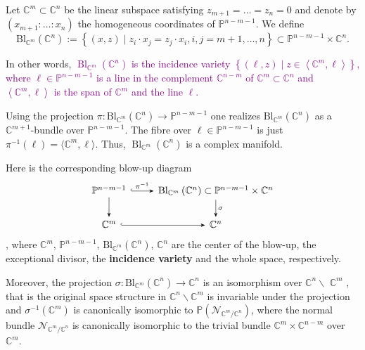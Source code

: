 \begin{exam}
    Let $\mathbb{C}^m \subset \mathbb{C}^n$ be the linear subspace satisfying $z_{m+1}=\ldots=z_n=0$ and denote by $\left(x_{m+1}: \ldots: x_n\right)$ the homogeneous coordinates of $\mathbb{P}^{n-m-1}$. We define
$$
\mathrm{Bl}_{\mathbb{C}^m}\left(\mathbb{C}^n\right):=\left\{(x, z) \mid z_i \cdot x_j=z_j \cdot x_i, i, j=m+1, \ldots, n\right\} \subset \mathbb{P}^{n-m-1} \times \mathbb{C}^n .
$$

In other words, \textcolor{purple}{$\operatorname{Bl}_{\mathbb{C}^m}\left(\mathbb{C}^n\right)$ is the incidence variety $\left\{(\ell, z) \mid z \in\left\langle\mathbb{C}^m, \ell\right\rangle\right\}$, where $\ell \in \mathbb{P}^{n-m-1}$ is a line in the complement $\mathbb{C}^{n-m}$ of $\mathbb{C}^m \subset \mathbb{C}^n$ and $\left\langle\mathbb{C}^m, \ell\right\rangle$ is the span of $\mathbb{C}^m$ and the line $\ell$.}

Using the projection $\pi: \mathrm{Bl}_{\mathbb{C}^m}\left(\mathbb{C}^n\right) \rightarrow \mathbb{P}^{n-m-1}$ one realizes $\mathrm{Bl}_{\mathbb{C}^m}\left(\mathbb{C}^n\right)$ as a $\mathbb{C}^{m+1}$-bundle over $\mathbb{P}^{n-m-1}$. The fibre over $\ell \in \mathbb{P}^{n-m-1}$ is just $\pi^{-1}(\ell)=\langle \mathbb{C}^m,\ell\rangle$. Thus, $\operatorname{Bl}_{\mathbb{C}^m}(\mathbb{C}^n)$ is a complex manifold.

Here is the corresponding blow-up diagram
\[
    \begin{tikzcd}
        \mathbb{P}^{n-m-1}\dar[-Stealth]\rar[-Stealth,hook,"\pi^{-1}"] & \mathrm{Bl}_{\mathbb{C}^m}\left(\mathbb{C}^n\right) \subset \mathbb{P}^{n-m-1}\times \mathbb{C}^n\dar[-Stealth,"\sigma"]\\ 
        \mathbb{C}^m \rar[-Stealth,hook] & \mathbb{C}^n
    \end{tikzcd}
\]  
, where $\mathbb{C}^m$, $\mathbb{P}^{n-m-1}$, $\mathrm{Bl}_{\mathbb{C}^m}\left(\mathbb{C}^n\right)$, $\mathbb{C}^n$ are the center of the blow-up, the exceptional divisor,  the \textbf{incidence variety} and the whole space, respectively.

Moreover, the projection $\sigma: \mathrm{Bl}_{\mathbb{C}^m}\left(\mathbb{C}^n\right) \rightarrow \mathbb{C}^n$ is an isomorphism over $\mathbb{C}^n \backslash$ $\mathbb{C}^m$ , that is the original space structure in $\mathbb{C}^n\backslash\mathbb{C}^m$ is invariable under the projection and $\sigma^{-1}\left(\mathbb{C}^m\right)$ is canonically isomorphic to $\mathbb{P}\left(\mathcal{N}_{\mathbb{C}^m / \mathbb{C}^n}\right)$, where the normal bundle $\mathcal{N}_{\mathbb{C}^m / \mathbb{C}^n}$ is canonically isomorphic to the trivial bundle $\mathbb{C}^m \times \mathbb{C}^{n-m}$ over $\mathbb{C}^m$.
\end{exam}

